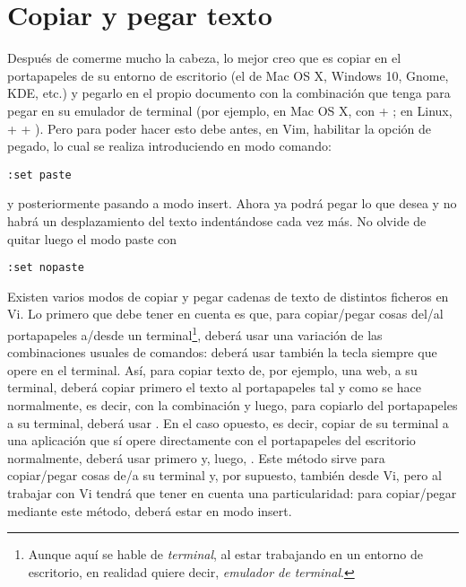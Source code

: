 \section{Copiar y pegar texto}\label{sec:vim-cop-peg}
Después de comerme mucho la cabeza, lo mejor creo que es copiar en el portapapeles de su entorno de escritorio
(el de Mac OS X, Windows 10, Gnome, KDE, etc.) y pegarlo en el propio documento con la combinación que tenga
para pegar en su emulador de terminal (por ejemplo, en Mac OS X, con  + ; en Linux,
 +  + ).  Pero para poder hacer esto debe antes, en Vim, habilitar la opción
de pegado, lo cual se realiza introduciendo en modo comando:

\begin{lstlisting}[gobble=2,style=bashinteract,escapechar=!]
  :set paste
\end{lstlisting}

\noindent y posteriormente pasando a modo insert. Ahora ya podrá pegar lo que desea y no habrá un desplazamiento
del texto indentándose cada vez más. No olvide de quitar luego el modo paste con

\begin{lstlisting}[gobble=2,style=bashinteract,escapechar=!]
  :set nopaste
\end{lstlisting}

Existen varios modos de copiar y pegar cadenas de texto de distintos ficheros en Vi. Lo primero que debe
tener en cuenta es que, para copiar/pegar cosas del/al portapapeles a/desde un terminal\footnote{Aunque aquí
se hable de \emph{terminal}, al estar trabajando en un entorno de escritorio, en realidad quiere decir,
\emph{emulador de terminal}.}, deberá usar una variación de las combinaciones usuales de comandos: deberá usar
también la tecla \tecla{\(\Uparrow\)} siempre que opere en el terminal.  Así, para copiar texto de, por
ejemplo, una web, a su terminal, deberá copiar primero el texto al portapapeles tal y como se hace
normalmente, es decir, con la combinación   y luego, para copiarlo del portapapeles a su
terminal, deberá usar  \tecla{\(\Uparrow\)} . En el caso opuesto, es decir, copiar de su
terminal a una aplicación que sí opere directamente con el portapapeles del escritorio normalmente, deberá
usar primero  \tecla{\(\Uparrow\)}  y, luego,  . Este método sirve
para copiar/pegar cosas de/a su terminal y, por supuesto, también desde Vi, pero al trabajar con Vi tendrá
que tener en cuenta una particularidad: para copiar/pegar mediante este método, deberá estar en modo insert.

